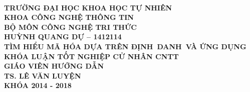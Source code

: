 \documentclass[class=article, crop=false]{standalone}
\begin{document}
	\begin{titlepage}
		\thisfancypage{%
		\fbox}{}
		
		\begin{center}
			\leavevmode \\[\baselineskip]
			\fontsize{13pt}{24pt}\selectfont\sffamily\bfseries
			TRƯỜNG ĐẠI HỌC KHOA HỌC TỰ NHIÊN \\
			KHOA CÔNG NGHỆ THÔNG TIN \\
			BỘ MÔN CÔNG NGHỆ TRI THỨC \\[2.5cm]
			\fontsize{14pt}{16.8pt}\selectfont\rmfamily
			HUỲNH QUANG DỰ -- 1412114 \\[2.5cm]
			\fontsize{20pt}{30pt}\selectfont\sffamily
			TÌM HIỂU MÃ HÓA DỰA TRÊN ĐỊNH~DANH~VÀ ỨNG DỤNG \\[1.5cm]
			\fontsize{14pt}{16.8pt}\selectfont\rmfamily
			KHÓA LUẬN TỐT NGHIỆP CỬ NHÂN CNTT \\[1.7cm]
			GIÁO VIÊN HƯỚNG DẪN \\[\baselineskip]
			\fontsize{13pt}{16.8pt}\selectfont\sffamily
			TS. LÊ VĂN LUYỆN \\[5cm]
			KHÓA 2014 - 2018
		\end{center}
	\end{titlepage}
\end{document}
